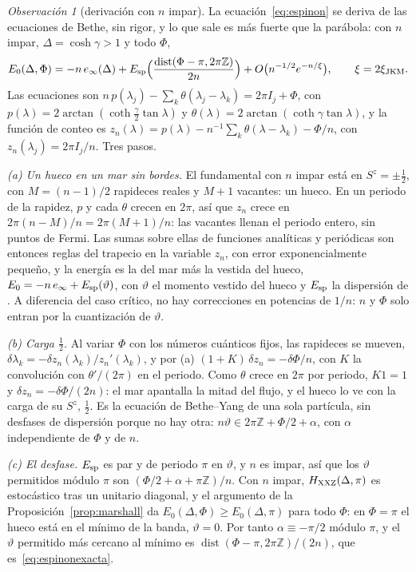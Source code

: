 \documentclass[11pt,a4paper]{article}
\theoremstyle{remark}
\newtheorem*{observacion}{Observación}
\begin{document}
\begin{observacion}[derivación con $n$ impar]\label{obs:espinon}
La ecuación~\eqref{eq:espinon} se deriva de las ecuaciones de Bethe, sin rigor, y lo que sale es
más fuerte que la parábola: con $n$ impar, $\Delta=\cosh\gamma>1$ y todo $\Phi$,
\begin{equation}\label{eq:espinonexacta}
  E_0(\Delta,\Phi)=-n\,e_\infty(\Delta)+E_{\rm sp}\Big(\frac{\operatorname{dist}(\Phi-\pi,2\pi\mathbb Z)}{2n}\Big)
  +O\big(n^{-1/2}e^{-n/\xi}\big),\qquad \xi=2\xi_{\rm JKM}.
\end{equation}
Las ecuaciones son $n\,p(\lambda_j)-\sum_k\theta(\lambda_j-\lambda_k)=2\pi I_j+\Phi$, con
$p(\lambda)=2\arctan(\coth\tfrac\gamma2\tan\lambda)$ y $\theta(\lambda)=2\arctan(\coth\gamma\tan\lambda)$,
y la función de conteo es $z_n(\lambda)=p(\lambda)-n^{-1}\sum_k\theta(\lambda-\lambda_k)-\Phi/n$, con
$z_n(\lambda_j)=2\pi I_j/n$. Tres pasos.

\emph{(a) Un hueco en un mar sin bordes.} El fundamental con $n$ impar está en $S^z=\pm\tfrac12$,
con $M=(n-1)/2$ rapideces reales y $M+1$ vacantes: un hueco. En un periodo de la rapidez, $p$ y
cada $\theta$ crecen en $2\pi$, así que $z_n$ crece en $2\pi(n-M)/n=2\pi(M+1)/n$: las vacantes
llenan el periodo entero, sin puntos de Fermi. Las sumas sobre ellas de funciones analíticas y
periódicas son entonces reglas del trapecio en la variable $z_n$, con error exponencialmente
pequeño, y la energía es la del mar más la vestida del hueco,
$E_0=-n\,e_\infty+E_{\rm sp}(\vartheta)$, con $\vartheta$ el momento vestido del hueco y $E_{\rm sp}$
la dispersión de \cite{des-cloizeaux-gaudin,jkm}. A diferencia del caso crítico, no hay
correcciones en potencias de $1/n$: $n$ y $\Phi$ solo entran por la cuantización de $\vartheta$.

\emph{(b) Carga $\tfrac12$.} Al variar $\Phi$ con los números cuánticos fijos, las rapideces se
mueven, $\delta\lambda_k=-\delta z_n(\lambda_k)/z_n'(\lambda_k)$, y por (a)
$(1+K)\,\delta z_n=-\delta\Phi/n$, con $K$ la convolución con $\theta'/(2\pi)$ en el periodo. Como
$\theta$ crece en $2\pi$ por periodo, $K1=1$ y $\delta z_n=-\delta\Phi/(2n)$: el mar apantalla
la mitad del flujo, y el hueco lo ve con la carga de su $S^z$, $\tfrac12$. Es la ecuación de
Bethe--Yang de una sola partícula, sin desfases de dispersión porque no hay otra:
$n\vartheta\in2\pi\mathbb Z+\Phi/2+\alpha$, con $\alpha$ independiente de $\Phi$ y de $n$.

\emph{(c) El desfase.} $E_{\rm sp}$ es par y de periodo $\pi$ en $\vartheta$, y $n$ es impar, así
que los $\vartheta$ permitidos módulo $\pi$ son $(\Phi/2+\alpha+\pi\mathbb Z)/n$. Con $n$ impar,
$H_{\rm XXZ}(\Delta,\pi)$ es estocástico tras un unitario diagonal, y el argumento de la
Proposición~\ref{prop:marshall} da $E_0(\Delta,\Phi)\ge E_0(\Delta,\pi)$ para todo $\Phi$: en
$\Phi=\pi$ el hueco está en el mínimo de la banda, $\vartheta=0$. Por tanto
$\alpha\equiv-\pi/2$ módulo $\pi$, y el $\vartheta$ permitido más cercano al mínimo es
$\operatorname{dist}(\Phi-\pi,2\pi\mathbb Z)/(2n)$, que es~\eqref{eq:espinonexacta}.


\end{observacion}
\end{document}
